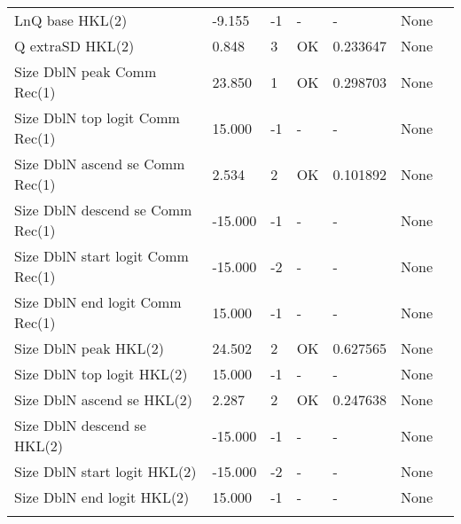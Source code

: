\documentclass[11pt,
  english,
  a4paper,
]{article}
\begin{document}
\begin{landscape}
\begin{longtable}[t]{>{\raggedright\arraybackslash}p{6cm}lllll>{\raggedright\arraybackslash}p{4cm}}
LnQ base HKL(2) & -9.155 & -1 & - & - & None\\
Q extraSD HKL(2) & 0.848 & 3 & OK & 0.233647 & None\\
Size DblN peak Comm Rec(1) & 23.850 & 1 & OK & 0.298703 & None\\
Size DblN top logit Comm Rec(1) & 15.000 & -1 & - & - & None\\
Size DblN ascend se Comm Rec(1) & 2.534 & 2 & OK & 0.101892 & None\\
Size DblN descend se Comm Rec(1) & -15.000 & -1 & - & - & None\\
Size DblN start logit Comm Rec(1) & -15.000 & -2 & - & - & None\\
Size DblN end logit Comm Rec(1) & 15.000 & -1 & - & - & None\\
Size DblN peak HKL(2) & 24.502 & 2 & OK & 0.627565 & None\\
Size DblN top logit HKL(2) & 15.000 & -1 & - & - & None\\
Size DblN ascend se HKL(2) & 2.287 & 2 & OK & 0.247638 & None\\
Size DblN descend se HKL(2) & -15.000 & -1 & - & - & None\\
Size DblN start logit HKL(2) & -15.000 & -2 & - & - & None\\
Size DblN end logit HKL(2) & 15.000 & -1 & - & - & None\\*
\end{longtable}
\endgroup{}
\end{landscape}
\endgroup{}





\newpage







\newpage



\newpage

\begingroup\fontsize{10}{12}\selectfont
\end{document}
